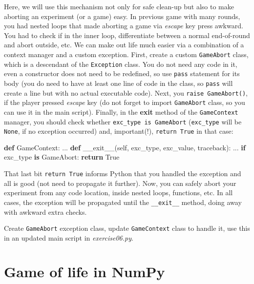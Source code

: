 \documentclass[
]{book}
\newenvironment{Shaded}{\begin{snugshade}}{\end{snugshade}}
\newcommand{\ControlFlowTok}[1]{\textcolor[rgb]{0.13,0.29,0.53}{\textbf{#1}}}
\newcommand{\FunctionTok}[1]{\textcolor[rgb]{0.00,0.00,0.00}{#1}}
\newcommand{\KeywordTok}[1]{\textcolor[rgb]{0.13,0.29,0.53}{\textbf{#1}}}
\newcommand{\NormalTok}[1]{#1}
\newcommand{\VariableTok}[1]{\textcolor[rgb]{0.00,0.00,0.00}{#1}}
\begin{document}
Here, we will use this mechanism not only for safe clean-up but also to make aborting an experiment (or a game) easy. In previous game with many rounds, you had nested loops that made aborting a game via \emph{escape} key press awkward. You had to check if in the inner loop, differentiate between a normal end-of-round and abort outside, etc. We can make out life much easier via a combination of a context manager and a custom exception. First, create a custom \texttt{GameAbort} class, which is a descendant of the \texttt{Exception} class. You do not need any code in it, even a constructor does not need to be redefined, so use \texttt{pass} statement for its body (you do need to have at least one line of code in the class, so \texttt{pass} will create a line but with no actual executable code). Next, you \texttt{raise\ GameAbort()}, if the player pressed \emph{escape} key (do not forget to import \texttt{GameAbort} class, so you can use it in the main script). Finally, in the \textbf{exit} method of the \texttt{GameContext} manager, you should check whether \texttt{exc\_type\ is\ GameAbort} (\texttt{exc\_type} will be \texttt{None}, if no exception occurred) and, important(!), \texttt{return\ True} in that case:

\begin{Shaded}
\begin{Highlighting}[]
\KeywordTok{def}\NormalTok{ GameContext:}
\NormalTok{    ...}
    \KeywordTok{def} \FunctionTok{\_\_exit\_\_}\NormalTok{(}\VariableTok{self}\NormalTok{, exc\_type, exc\_value, traceback):}
\NormalTok{        ...}
        \ControlFlowTok{if}\NormalTok{ exc\_type }\KeywordTok{is}\NormalTok{ GameAbort:}
            \ControlFlowTok{return} \VariableTok{True}
  
\end{Highlighting}
\end{Shaded}

That last bit \texttt{return\ True} informs Python that you handled the exception and all is good (not need to propagate it further). Now, you can safely abort your experiment from any code location, inside nested loops, functions, etc. In all cases, the exception will be propagated until the \texttt{\_\_exit\_\_} method, doing away with awkward extra checks.

Create \texttt{GameAbort} exception class, update \texttt{GameContext} class to handle it, use this in an updated main script in \emph{exercise06.py}.

\hypertarget{seminar-02-08}{%
\chapter{Game of life in NumPy}\label{seminar-02-08}}
\end{document}
